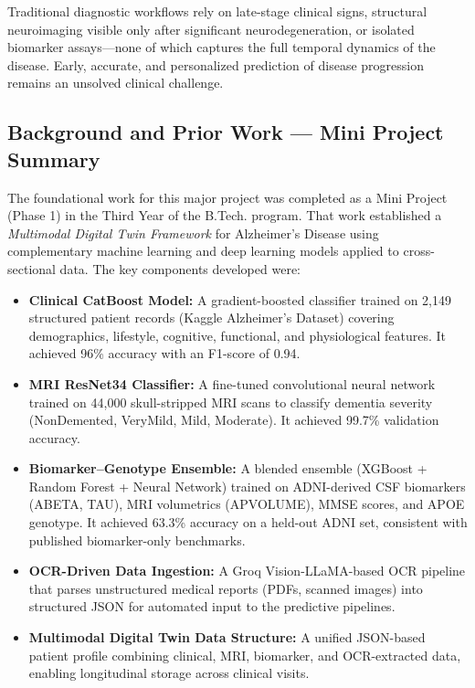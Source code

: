\documentclass[12pt,singleside,a4paper]{article}
\begin{document}
Traditional diagnostic workflows rely on late-stage clinical signs, structural neuroimaging visible only after significant neurodegeneration, or isolated biomarker assays—none of which captures the full temporal dynamics of the disease. Early, accurate, and personalized prediction of disease progression remains an unsolved clinical challenge.

\subsection{Background and Prior Work — Mini Project Summary}

The foundational work for this major project was completed as a Mini Project (Phase 1) in the Third Year of the B.Tech. program. That work established a \textit{Multimodal Digital Twin Framework} for Alzheimer's Disease using complementary machine learning and deep learning models applied to cross-sectional data. The key components developed were:

\begin{itemize}
    \item \textbf{Clinical CatBoost Model:} A gradient-boosted classifier trained on 2,149 structured patient records (Kaggle Alzheimer's Dataset) covering demographics, lifestyle, cognitive, functional, and physiological features. It achieved 96\% accuracy with an F1-score of 0.94.
    \item \textbf{MRI ResNet34 Classifier:} A fine-tuned convolutional neural network trained on 44,000 skull-stripped MRI scans to classify dementia severity (NonDemented, VeryMild, Mild, Moderate). It achieved 99.7\% validation accuracy.
    \item \textbf{Biomarker--Genotype Ensemble:} A blended ensemble (XGBoost + Random Forest + Neural Network) trained on ADNI-derived CSF biomarkers (ABETA, TAU), MRI volumetrics (APVOLUME), MMSE scores, and APOE genotype. It achieved 63.3\% accuracy on a held-out ADNI set, consistent with published biomarker-only benchmarks.
    \item \textbf{OCR-Driven Data Ingestion:} A Groq Vision-LLaMA-based OCR pipeline that parses unstructured medical reports (PDFs, scanned images) into structured JSON for automated input to the predictive pipelines.
    \item \textbf{Multimodal Digital Twin Data Structure:} A unified JSON-based patient profile combining clinical, MRI, biomarker, and OCR-extracted data, enabling longitudinal storage across clinical visits.
\end{itemize}
\end{document}
